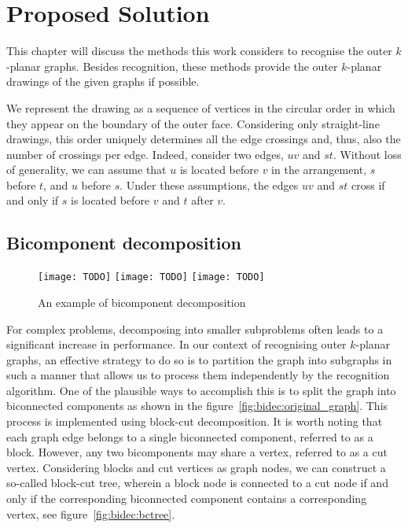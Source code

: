 \chapter{Proposed Solution}

This chapter will discuss the methods this work considers to recognise the outer \(k\)-planar graphs. Besides recognition, these methods provide the outer \(k\)-planar drawings of the given graphs if possible.

We represent the drawing as a sequence of vertices in the circular order in which they appear on the boundary of the outer face. Considering only straight-line drawings, this order uniquely determines all the edge crossings and, thus, also the number of crossings per edge. Indeed, consider two edges, \(uv\) and \(st\). Without loss of generality, we can assume that \(u\) is located before \(v\) in the arrangement, \(s\) before \(t\), and \(u\) before \(s\). Under these assumptions, the edges \(uv\) and \(st\) cross if and only if \(s\) is located before \(v\) and \(t\) after \(v\).


\section{Bicomponent decomposition}

\begin{figure}
    \centering
     {
        \texttt{[image: TODO]}
    }
    \hfill
     {
        \texttt{[image: TODO]}
    }
    \hfill
    \hfill
     {
        \texttt{[image: TODO]}
    }
    \caption{An example of bicomponent decomposition}
\end{figure}

For complex problems, decomposing into smaller subproblems often leads to a significant increase in performance. In our context of recognising outer \(k\)-planar graphs, an effective strategy to do so is to partition the graph into subgraphs in such a manner that allows us to process them independently by the recognition algorithm. One of the plausible ways to accomplish this is to split the graph into biconnected components as shown in the figure~\ref{fig:bidec:original_graph}. This process is implemented using block-cut decomposition. It is worth noting that each graph edge belongs to a single biconnected component, referred to as a block. However, any two bicomponents may share a vertex, referred to as a cut vertex. Considering blocks and cut vertices as graph nodes, we can construct a so-called block-cut tree, wherein a block node is connected to a cut node if and only if the corresponding biconnected component contains a corresponding vertex, see figure~\ref{fig:bidec:bctree}.

